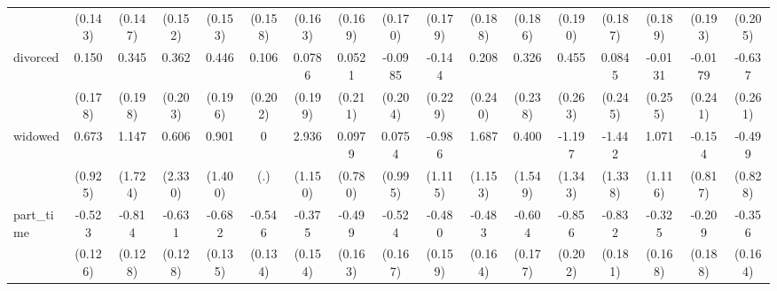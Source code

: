{\begin{tabular}{l*{16}{c}}
                    &     (0.143)         &     (0.147)         &     (0.152)         &     (0.153)         &     (0.158)         &     (0.163)         &     (0.169)         &     (0.170)         &     (0.179)         &     (0.188)         &     (0.186)         &     (0.190)         &     (0.187)         &     (0.189)         &     (0.193)         &     (0.205)         \\
[1em]
divorced            &       0.150         &       0.345         &       0.362         &       0.446\sym{*}  &       0.106         &      0.0786         &      0.0521         &     -0.0985         &      -0.144         &       0.208         &       0.326         &       0.455         &      0.0845         &     -0.0131         &     -0.0179         &      -0.637\sym{*}  \\
                    &     (0.178)         &     (0.198)         &     (0.203)         &     (0.196)         &     (0.202)         &     (0.199)         &     (0.211)         &     (0.204)         &     (0.229)         &     (0.240)         &     (0.238)         &     (0.263)         &     (0.245)         &     (0.255)         &     (0.241)         &     (0.261)         \\
[1em]
widowed             &       0.673         &       1.147         &       0.606         &       0.901         &           0         &       2.936\sym{*}  &      0.0979         &      0.0754         &      -0.986         &       1.687         &       0.400         &      -1.197         &      -1.442         &       1.071         &      -0.154         &      -0.499         \\
                    &     (0.925)         &     (1.724)         &     (2.330)         &     (1.400)         &         (.)         &     (1.150)         &     (0.780)         &     (0.995)         &     (1.115)         &     (1.153)         &     (1.549)         &     (1.343)         &     (1.338)         &     (1.116)         &     (0.817)         &     (0.828)         \\
[1em]
part\_time           &      -0.523\sym{***}&      -0.814\sym{***}&      -0.631\sym{***}&      -0.682\sym{***}&      -0.546\sym{***}&      -0.375\sym{*}  &      -0.499\sym{**} &      -0.524\sym{**} &      -0.480\sym{**} &      -0.483\sym{**} &      -0.604\sym{***}&      -0.856\sym{***}&      -0.832\sym{***}&      -0.325         &      -0.209         &      -0.356\sym{*}  \\
                    &     (0.126)         &     (0.128)         &     (0.128)         &     (0.135)         &     (0.134)         &     (0.154)         &     (0.163)         &     (0.167)         &     (0.159)         &     (0.164)         &     (0.177)         &     (0.202)         &     (0.181)         &     (0.168)         &     (0.188)         &     (0.164)         \\

\end{tabular}}
